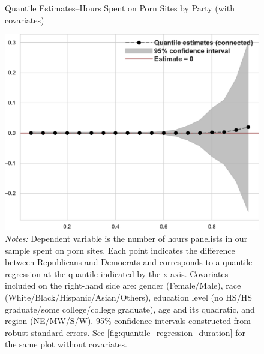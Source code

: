 \documentclass[12pt, letterpaper]{article}
\begin{document}
\begin{figure}[ht]
	\centering
	\caption{Quantile Estimates--Hours Spent on Porn Sites by Party (with covariates)}
	\includegraphics[width=.55\linewidth]{../figs/quantile_reg_covariates_duration_adult.pdf}
	\caption*{\footnotesize \emph{Notes:} 
		Dependent variable is the number of hours panelists in our sample spent on porn sites.
		Each point indicates the difference between Republicans and Democrats and corresponds to a quantile regression at the quantile indicated by the x-axis.
		Covariates included on the right-hand side are: gender (Female/Male), race (White/Black/Hispanic/Asian/Others), education level (no HS/HS graduate/some college/college graduate), age and its quadratic, and region (NE/MW/S/W).
		95\% confidence intervals constructed from robust standard errors.
		See \cref{fig:quantile_regression_duration} for the same plot without covariates.
	}
	\label{fig:quantile_regression_duration_covariates}
\end{figure}
\end{document}
